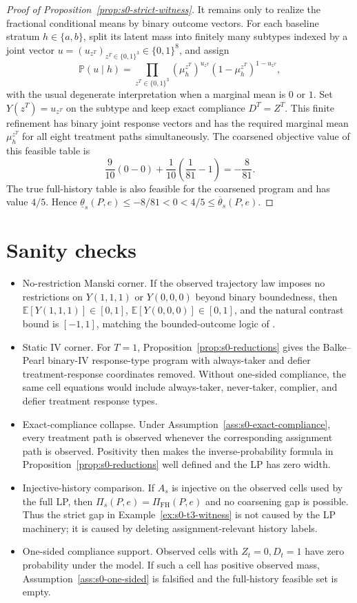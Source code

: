 \documentclass[11pt]{article}
\newcommand{\E}{\mathbb{E}}
\renewcommand{\Pr}{\mathbb{P}}
\theoremstyle{definition}
\theoremstyle{plain}
\theoremstyle{remark}
\begin{document}
\begin{proof}[Proof of Proposition~\ref{prop:s0-strict-witness}]
It remains only to realize the fractional conditional means by binary
outcome vectors.  For each baseline stratum \(h\in\{a,b\}\), split its
latent mass into finitely many subtypes indexed by a joint vector
\(u=(u_{z^T})_{z^T\in\{0,1\}^3}\in\{0,1\}^{8}\), and assign
\[
\Pr(u\mid h)=
\prod_{z^T\in\{0,1\}^3}
(\mu_h^{z^T})^{u_{z^T}}(1-\mu_h^{z^T})^{1-u_{z^T}},
\]
with the usual degenerate interpretation when a marginal mean is \(0\) or
\(1\).
Set \(Y(z^T)=u_{z^T}\) on the subtype and keep exact compliance
\(D^T=Z^T\).  This finite refinement has binary joint response vectors
and has the required marginal mean \(\mu_h^{z^T}\) for all eight
treatment paths simultaneously.  The coarsened objective value of this
feasible table is
\[
\frac{9}{10}(0-0)+\frac{1}{10}\left(\frac1{81}-1\right)
=-\frac8{81}.
\]
The true full-history table is also feasible for the coarsened program and has value \(4/5\).  Hence \(\underline\theta_s(P,e)\le -8/81<0<4/5\le\overline\theta_s(P,e)\).
\end{proof}

\section{Sanity checks}
\begin{itemize}[leftmargin=*]
\item No-restriction Manski corner.  If the observed trajectory law imposes no restrictions on \(Y(1,1,1)\) or \(Y(0,0,0)\) beyond binary boundedness, then \(\E[Y(1,1,1)]\in[0,1]\), \(\E[Y(0,0,0)]\in[0,1]\), and the natural contrast bound is \([-1,1]\), matching the bounded-outcome logic of \cite{Manski1990}.
\item Static IV corner.  For \(T=1\), Proposition~\ref{prop:s0-reductions} gives the Balke--Pearl binary-IV response-type program with always-taker and defier treatment-response coordinates removed.  Without one-sided compliance, the same cell equations would include always-taker, never-taker, complier, and defier treatment response types.
\item Exact-compliance collapse.  Under Assumption~\ref{ass:s0-exact-compliance}, every treatment path is observed whenever the corresponding assignment path is observed.  Positivity then makes the inverse-probability formula in Proposition~\ref{prop:s0-reductions} well defined and the LP has zero width.
\item Injective-history comparison.  If \(A_s\) is injective on the observed cells used by the full LP, then \(\Pi_s(P,e)=\Pi_{\mathrm{FH}}(P,e)\) and no coarsening gap is possible.  Thus the strict gap in Example~\ref{ex:s0-t3-witness} is not caused by the LP machinery; it is caused by deleting assignment-relevant history labels.
\item One-sided compliance support.  Observed cells with \(Z_t=0,D_t=1\) have zero probability under the model.  If such a cell has positive observed mass, Assumption~\ref{ass:s0-one-sided} is falsified and the full-history feasible set is empty.
\end{itemize}
\end{document}
